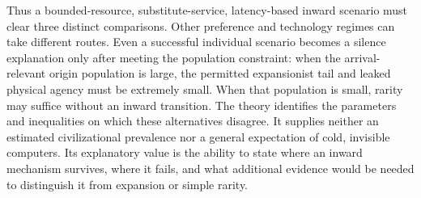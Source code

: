 Thus a bounded-resource, substitute-service, latency-based inward scenario
must clear three distinct comparisons. Other preference and technology
regimes can take different routes. Even a successful individual scenario
becomes a silence explanation only after meeting the population constraint:
when the arrival-relevant origin population is large, the permitted
expansionist tail and leaked physical agency must be extremely small.
When that population is small, rarity may suffice without an inward
transition. The theory identifies the parameters and inequalities on
which these alternatives disagree. It supplies neither an estimated
civilizational prevalence nor a general expectation of cold, invisible
computers. Its explanatory value is the ability to state where an inward
mechanism survives, where it fails, and what additional evidence would be
needed to distinguish it from expansion or simple rarity.
